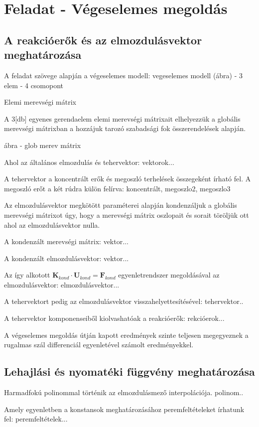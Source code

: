 \documentclass{article}
\begin{document}
	\section{Feladat - Végeselemes megoldás}
	\subsection{A reakcióerők és az elmozdulásvektor meghatározása}
		A feladat szövege alapján a végeselemes modell:
		vegeselemes modell (ábra) - 3 elem - 4 csomopont
		
		Elemi merevségi mátrix
		
		A 3[db] egyenes gerendaelem elemi merevségi mátrixait elhelyezzük a globális merevségi mátrixban a hozzájuk tarozó szabadsági fok összerendelések alapján.
		
		ábra - glob merev mátrix
		
		Ahol az általános elmozdulás és tehervektor:
		vektorok...
		
		A tehervektor a koncentrált erők és megoszló terhelések összegeként írható fel. A megoszló erőt a két rúdra külön felírva:
		koncentrált, megoszlo2, megoszlo3
		
		Az elmozdulásvektor megkötött paraméterei alapján kondenzáljuk a globális merevségi mátrixot úgy, hogy a merevségi mátrix oszlopait és sorait töröljük ott ahol az elmozdulásvektor nulla.
		
		A kondenzált merevségi mátrix:
		vektor...
		
		A kondenzált elmozdulásvektor:
		vektor...
		
		Az így alkotott $\textbf{K}_{kond}\cdot\textbf{U}_{kond}=\textbf{F}_{kond}$ egyenletrendszer megoldásával az elmozdulásvektor:
		elmozdulásvektor...
		
		A tehervektort pedig az elmozdulásvektor visszahelyettesítésével:
		tehervektor..
		
		A tehervektor komponenseiből kiolvashatóak a reakcióerők:
		rekcióerok...
		
		A végeselemes megoldás útján kapott eredmények szinte teljesen megegyeznek a rugalmas szál differenciál egyenletével számolt eredményekkel.
	\subsection{Lehajlási és nyomatéki függvény meghatározása}
		Harmadfokú polinommal történik az elmozdulásmező interpolációja.
		polinom..
		
		Amely egyenletben a konstansok meghatározásához peremfeltételeket írhatunk fel:
		peremfeltételek...
		
\end{document}
